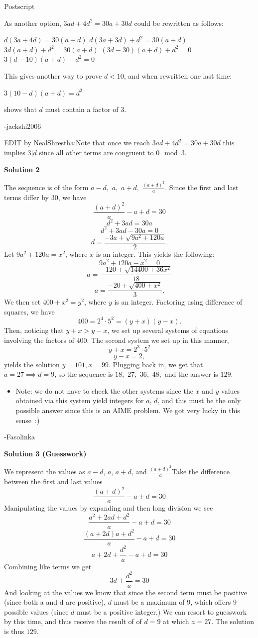\begin{enumerate}
 
Postscript

 As another option, $3ad + 4d^2 = 30a + 30d$ could be rewritten as follows:

 
$d(3a + 4d) = 30(a + d)$
$d(3a + 3d)+ d^2 = 30(a + d)$
$3d(a + d)+ d^2 = 30(a + d)$
$(3d - 30)(a + d)+ d^2 = 0$
$3(d - 10)(a + d)+ d^2 = 0$

 
This gives another way to prove $d<10$, and when rewritten one last time:

 
$3(10 -d)(a + d) = d^2$

 
shows that $d$ must contain a factor of 3.

 
-jackshi2006

 EDIT by NealShrestha:Note that once we reach $3ad + 4d^2 = 30a + 30d$ this implies $3|d$ since all other terms are congruent to $0\mod 3$.

 



\textbf{Solution 2}

The sequence is of the form $a-d,$ $a,$ $a+d,$ $\frac{(a+d)^2}{a}$. Since the first and last terms differ by 30, we have 
 \[\frac{(a+d)^2}{a}-a+d=30\]
 \[d^2+3ad=30a\]
 \[d^2+3ad-30a=0\]
 \[d=\frac{-3a + \sqrt{9a^2+120a}}{2}.\]Let $9a^2+120a=x^2$, where $x$ is an integer. This yields the following: 
 \[9a^2+120a-x^2=0\]
 \[a=\frac{-120 + \sqrt{14400+36x^2}}{18}\]
 \[a=\frac{-20 + \sqrt{400+x^2}}{3}.\]We then set $400+x^2=y^2$, where $y$ is an integer. Factoring using difference of squares, we have 
 \[400=2^4 \cdot 5^2=(y+x)(y-x).\]Then, noticing that $y+x > y-x$, we set up several systems of equations involving the factors of $400$. The second system we set up in this manner, 
 \[y+x=2^3 \cdot 5^2\] 
 \[y-x=2,\]yields the solution $y=101, x=99$. Plugging back in, we get that $a=27 \implies d=9$, so the sequence is $18,$ $27,$ $36,$ $48,$ and the answer is $\boxed{129}.$

            \begin{itemize}
        \item Note: we do not have to check the other systems since the $x$ and $y$ values obtained via this system yield integers for $a$, $d$, and this must be the only possible answer since this is an AIME problem. We got very lucky in this sense :)
            \end{itemize}
            -Fasolinka

 



\textbf{Solution 3 (Guesswork)}

We represent the values as $a-d$, $a$, $a+d$, and $\frac{(a+d)^2}{a}$Take the difference between the first and last values
 \[\frac{(a+d)^2}{a}-a+d=30\]Manipulating the values by expanding and then long division we see
 \[\frac{a^2+2ad+d^2}{a}-a+d=30\]
 \[\frac{(a+2d)a+d^2}{a}-a+d=30\]
 \[a+2d+\frac{d^2}{a}-a+d=30\]Combining like terms we get
 \[3d+\frac{d^2}{a}=30\]And looking at the values we know that since the second term must be positive (since both a and d are positive), $d$ must be a maximum of 9, which offers 9 possible values (since $d$ must be a positive integer.) We can resort to guesswork by this time, and thus receive the result of of $d=9$ at which $a=27$. The solution is thus $\boxed{129}.$


\end{enumerate}
